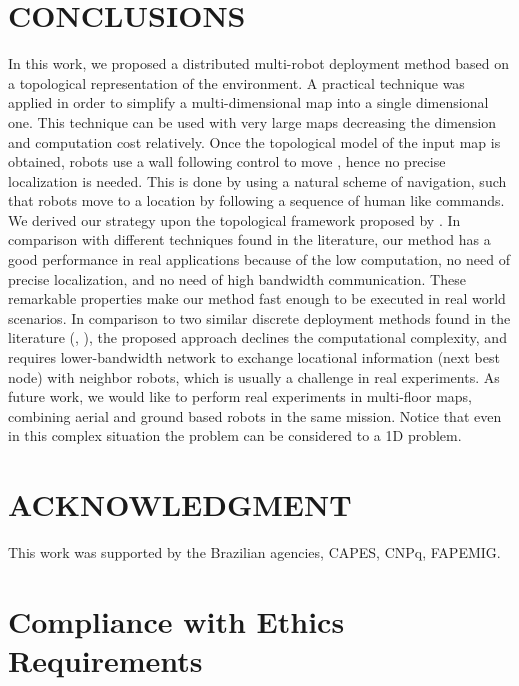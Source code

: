 \documentclass[smallcondensed]{svjour3}
\begin{document}
\section{CONCLUSIONS}
\label{sec:conclusion}

In this work, we proposed a distributed multi-robot deployment method based on a topological representation of the environment. A practical technique was applied in order to simplify a multi-dimensional map into a single dimensional one. This technique can be used with very large maps decreasing the dimension and computation cost relatively.
%
Once the topological model of the input map is obtained, robots use a wall following control to move , hence no precise localization is needed. This is done by using a natural scheme of navigation, such that robots move to a location by following a sequence of human like commands. 
%
We derived our strategy upon the topological framework proposed by \cite{Arthur2015}. In comparison with different techniques found in the literature, our method has a good performance in real applications because of the low computation, no need of precise localization, and no need of high bandwidth communication. These remarkable properties make our method fast enough to be executed in real world scenarios. 
%
In comparison to two similar discrete deployment methods found in the literature (\cite{Yun2013}, \cite{Durham2012}), the proposed approach declines the computational complexity, and requires lower-bandwidth network to exchange locational information (next best node) with neighbor robots, which is usually a challenge in real experiments.
%
As future work, we would like to perform real experiments in multi-floor maps, combining aerial and ground based robots in the same mission. Notice that even in this complex situation the problem can be considered to a 1D problem.


\section*{ACKNOWLEDGMENT}

This work was supported by the Brazilian agencies, CAPES, CNPq, FAPEMIG.

\section*{Compliance with Ethics Requirements}
\end{document}
